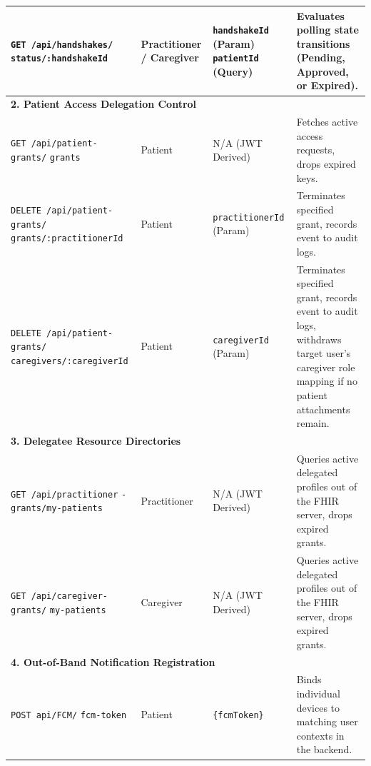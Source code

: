 \begin{center}
\begin{longtable}{|p{5cm}|p{2.2cm}|p{3.2cm}|p{3.9cm}|}
\texttt{GET /api/handshakes/} \newline \texttt{status/:handshakeId} & 
Practitioner \newline / Caregiver & 
\texttt{handshakeId} (Param) \newline \texttt{patientId} (Query) & 
Evaluates polling state transitions (Pending, Approved, or Expired). \\ \hline

\hline
\multicolumn{4}{|l|}{\textbf{2. Patient Access Delegation Control}} \\ \hline
\texttt{GET /api/patient-grants/} \newline \texttt{grants} & 
Patient & 
N/A (\ac{JWT} Derived) & 
Fetches active access requests, drops expired keys. \\ \hline

\texttt{DELETE /api/patient-grants/} \newline \texttt{grants/:practitionerId} & 
Patient & 
\texttt{practitionerId} (Param) & 
Terminates specified grant, records event to audit logs. \\ \hline

\texttt{DELETE /api/patient-grants/} \newline \texttt{caregivers/}\newline \texttt{:caregiverId} & 
Patient & 
\texttt{caregiverId} (Param) & 
Terminates specified grant, records event to audit logs, withdraws target user's caregiver role mapping if no patient attachments remain. \\ \hline

\hline
\multicolumn{4}{|l|}{\textbf{3. Delegatee Resource Directories}} \\ \hline
\texttt{GET /api/practitioner} \newline \texttt{-grants/my-patients} & 
Practitioner & 
N/A (\ac{JWT} Derived) & 
Queries active delegated profiles out of the \ac{FHIR} server, drops expired grants. \\ \hline

\texttt{GET /api/caregiver-grants/} \newline \texttt{my-patients} & 
Caregiver & 
N/A (\ac{JWT} Derived) & 
Queries active delegated profiles out of the \ac{FHIR} server, drops expired grants. \\ \hline

\hline
\multicolumn{4}{|l|}{\textbf{4. Out-of-Band Notification Registration}} \\ \hline
\texttt{POST api/FCM/} \newline \texttt{fcm-token} & 
Patient & 
\texttt{\{fcmToken\}} & 
Binds individual devices to matching user contexts in the backend. \\ \hline
\end{longtable}
\setlength{\tabcolsep}{6pt}
\end{center}

